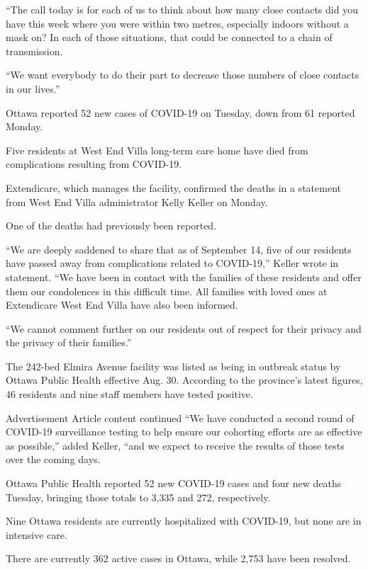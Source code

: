\documentclass[]{article}
\newenvironment{Shaded}{\begin{snugshade}}{\end{snugshade}}
\newcommand{\StringTok}[1]{\textcolor[rgb]{0.31,0.60,0.02}{#1}}
\begin{document}
\begin{Shaded}
\begin{Highlighting}[]
\StringTok{“The call today is for each of us to think about how many close contacts did you have this week where you were within two metres, especially indoors without a mask on? In each of those situations, that could be connected to a chain of transmission.}

\StringTok{“We want everybody to do their part to decrease those numbers of close contacts in our lives.”}

\StringTok{Ottawa reported 52 new cases of COVID-19 on Tuesday, down from 61 reported Monday.}

\StringTok{Five residents at West End Villa long-term care home have died from complications resulting from COVID-19.}

\StringTok{Extendicare, which manages the facility, confirmed the deaths in a statement from West End Villa administrator Kelly Keller on Monday.}

\StringTok{One of the deaths had previously been reported.}

\StringTok{“We are deeply saddened to share that as of September 14, five of our residents have passed away from complications related to COVID-19,” Keller wrote in statement. “We have been in contact with the families of these residents and offer them our condolences in this difficult time. All families with loved ones at Extendicare West End Villa have also been informed.}

\StringTok{“We cannot comment further on our residents out of respect for their privacy and the privacy of their families.”}

\StringTok{The 242-bed Elmira Avenue facility was listed as being in outbreak status by Ottawa Public Health effective Aug. 30. According to the province’s latest figures, 46 residents and nine staff members have tested positive.}

\StringTok{Advertisement}
\StringTok{Article content continued}
\StringTok{“We have conducted a second round of COVID-19 surveillance testing to help ensure our cohorting efforts are as effective as possible,” added Keller, “and we expect to receive the results of those tests over the coming days.}

\StringTok{Ottawa Public Health reported 52 new COVID-19 cases and four new deaths Tuesday, bringing those totals to 3,335 and 272, respectively.}

\StringTok{Nine Ottawa residents are currently hospitalized with COVID-19, but none are in intensive care.}

\StringTok{There are currently 362 active cases in Ottawa, while 2,753 have been resolved.}


\end{Highlighting}
\end{Shaded}
\end{document}
